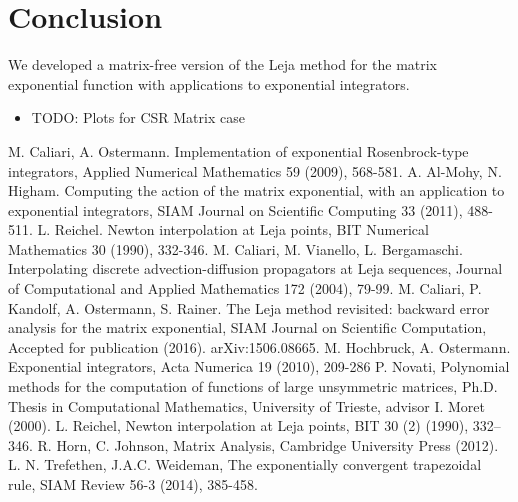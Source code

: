 \documentclass{scrartcl}
\begin{document}
	\section{Conclusion}
	We developed a matrix-free version of the Leja method for the matrix exponential function with applications to exponential integrators. 


\begin{itemize}
	\item TODO: Plots for CSR Matrix case		
\end{itemize}

\clearpage


\begin{thebibliography}{13}
	 M. Caliari, A. Ostermann. Implementation of exponential Rosenbrock-type integrators, Applied Numerical Mathematics 59 (2009), 568-581.
	 A. Al-Mohy, N. Higham. Computing the action of the matrix exponential, with an application to exponential integrators, SIAM Journal on Scientific Computing 33 (2011), 488-511.
	 L. Reichel. Newton interpolation at Leja points, BIT Numerical Mathematics 30 (1990), 332-346.
	 M. Caliari, M. Vianello, L. Bergamaschi. Interpolating discrete advection-diffusion propagators at Leja sequences, Journal of Computational and Applied Mathematics 172 (2004), 79-99.
	 M. Caliari, P. Kandolf, A. Ostermann, S. Rainer. The Leja method revisited: backward error analysis for the matrix exponential, SIAM Journal on Scientific Computation, Accepted for publication (2016). arXiv:1506.08665.
	 M. Hochbruck, A. Ostermann. Exponential integrators, Acta Numerica 19 (2010), 209-286
	 P. Novati, Polynomial methods for the computation of functions of large unsymmetric matrices, Ph.D. Thesis in Computational Mathematics, University of Trieste, advisor I. Moret (2000).
	 L. Reichel, Newton interpolation at Leja points, BIT 30 (2) (1990), 332–346.
	 R. Horn, C. Johnson, Matrix Analysis, Cambridge University Press (2012).
	 L. N. Trefethen, J.A.C. Weideman, The exponentially convergent trapezoidal rule, SIAM Review 56-3 (2014), 385-458.
	

\end{thebibliography}
\end{document}
